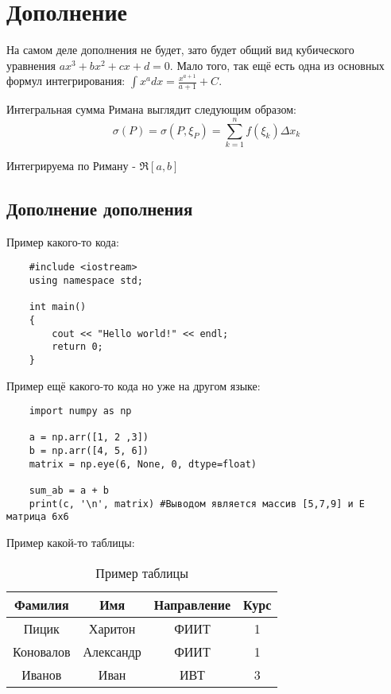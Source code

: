 \section*{Дополнение}
На самом деле дополнения не будет, зато будет общий вид кубического уравнения $ax^3 + bx^2 + cx + d = 0$. Мало того, так ещё есть 
одна из основных формул интегрирования: $\int x^adx = \frac {x^{a+1}} {a+1} + C$.

Интегральная сумма Римана выглядит следующим образом:
\begin{equation*}
    \sigma(P) = \sigma(P, \xi_{P}) = \sum\limits_{k = 1}^{n}f(\xi_k)\Delta x_k
\end{equation*}

Интегрируема по Риману - $\Re[a, b]$

\subsection*{Дополнение дополнения}
Пример какого-то кода:
\begin{verbatim}
    #include <iostream>
    using namespace std;

    int main()
    {
        cout << "Hello world!" << endl;
        return 0;
    }
\end{verbatim}

Пример ещё какого-то кода но уже на другом языке:
\begin{verbatim}
    import numpy as np

    a = np.arr([1, 2 ,3])
    b = np.arr([4, 5, 6])
    matrix = np.eye(6, None, 0, dtype=float)

    sum_ab = a + b
    print(c, '\n', matrix) #Выводом является массив [5,7,9] и E матрица 6x6
\end{verbatim}

\newpage
Пример какой-то таблицы:
\begin{table}[H]
    \begin{tabular}{|c|c|c|c|}
        \hline
        \textbf{Фамилия} & \textbf{Имя} & \textbf{Направление} & \textbf{Курс} \\ \hline
        Пицик            & Харитон      & ФИИТ                 & 1             \\ \hline
        Коновалов        & Александр    & ФИИТ                 & 1             \\ \hline
        Иванов           & Иван         & ИВТ                  & 3             \\ \hline
    \end{tabular}

    \caption*{Пример таблицы}
    \label{tab:my-table}
\end{table}
